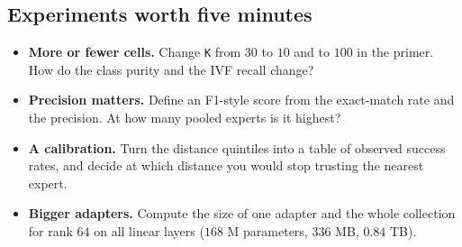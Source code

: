 \documentclass[11pt]{article}
\begin{document}
\subsection{Experiments worth five minutes}
\begin{itemize}[nosep]
  \item \textbf{More or fewer cells.} Change \texttt{K} from $30$ to $10$ and to $100$ in the primer. How do the class purity and the IVF recall change?
  \item \textbf{Precision matters.} Define an F1-style score from the exact-match rate and the precision. At how many pooled experts is it highest?
  \item \textbf{A calibration.} Turn the distance quintiles into a table of observed success rates, and decide at which distance you would stop trusting the nearest expert.
  \item \textbf{Bigger adapters.} Compute the size of one adapter and the whole collection for rank $64$ on all linear layers ($168$ M parameters, $336$ MB, $0.84$ TB).
\end{itemize}

\end{document}
